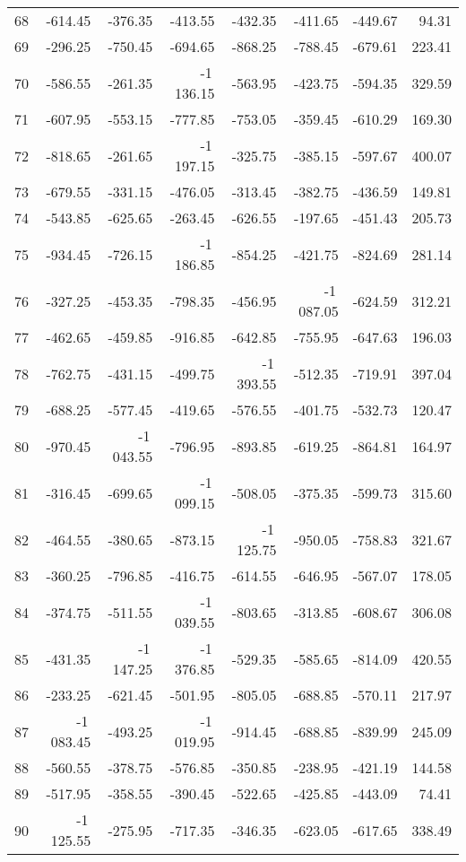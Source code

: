 \begin{longtable}{rrrrrrrr}
68 & -614.45 & -376.35 & -413.55 & -432.35 & -411.65 & -449.67 & 94.31  \\
69 & -296.25 & -750.45 & -694.65 & -868.25 & -788.45 & -679.61 & 223.41  \\
70 & -586.55 & -261.35 & -1\,136.15 & -563.95 & -423.75 & -594.35 & 329.59  \\
71 & -607.95 & -553.15 & -777.85 & -753.05 & -359.45 & -610.29 & 169.30  \\
72 & -818.65 & -261.65 & -1\,197.15 & -325.75 & -385.15 & -597.67 & 400.07  \\
73 & -679.55 & -331.15 & -476.05 & -313.45 & -382.75 & -436.59 & 149.81  \\
74 & -543.85 & -625.65 & -263.45 & -626.55 & -197.65 & -451.43 & 205.73  \\
75 & -934.45 & -726.15 & -1\,186.85 & -854.25 & -421.75 & -824.69 & 281.14  \\
76 & -327.25 & -453.35 & -798.35 & -456.95 & -1\,087.05 & -624.59 & 312.21  \\
77 & -462.65 & -459.85 & -916.85 & -642.85 & -755.95 & -647.63 & 196.03  \\
78 & -762.75 & -431.15 & -499.75 & -1\,393.55 & -512.35 & -719.91 & 397.04  \\
79 & -688.25 & -577.45 & -419.65 & -576.55 & -401.75 & -532.73 & 120.47  \\
80 & -970.45 & -1\,043.55 & -796.95 & -893.85 & -619.25 & -864.81 & 164.97  \\
81 & -316.45 & -699.65 & -1\,099.15 & -508.05 & -375.35 & -599.73 & 315.60  \\
82 & -464.55 & -380.65 & -873.15 & -1\,125.75 & -950.05 & -758.83 & 321.67  \\
83 & -360.25 & -796.85 & -416.75 & -614.55 & -646.95 & -567.07 & 178.05  \\
84 & -374.75 & -511.55 & -1\,039.55 & -803.65 & -313.85 & -608.67 & 306.08  \\
85 & -431.35 & -1\,147.25 & -1\,376.85 & -529.35 & -585.65 & -814.09 & 420.55  \\
86 & -233.25 & -621.45 & -501.95 & -805.05 & -688.85 & -570.11 & 217.97  \\
87 & -1\,083.45 & -493.25 & -1\,019.95 & -914.45 & -688.85 & -839.99 & 245.09  \\
88 & -560.55 & -378.75 & -576.85 & -350.85 & -238.95 & -421.19 & 144.58  \\
89 & -517.95 & -358.55 & -390.45 & -522.65 & -425.85 & -443.09 & 74.41  \\
90 & -1\,125.55 & -275.95 & -717.35 & -346.35 & -623.05 & -617.65 & 338.49  \\

\end{longtable}
